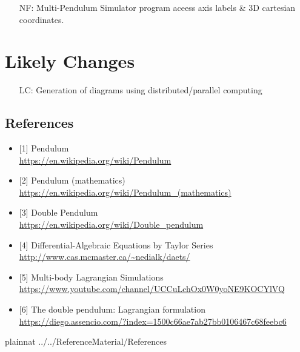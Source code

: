 \documentclass[12pt]{article}
\newcounter{reqnum} %
\newcounter{nfreqnum} %
\newcounter{lcnum} %
\begin{document}
\begin{itemize}
\item[NF\refstepcounter{nfreqnum}\thenfreqnum:] Multi-Pendulum Simulator program aceess axis labels \& 3D cartesian coordinates.
\end{itemize}

\section{Likely Changes}    

\noindent \begin{itemize}

\item[LC\refstepcounter{lcnum}\thelcnum:] Generation of diagrams 
  using distributed/parallel computing

\end{itemize}

\subsection*{References}
\begin{itemize}
\item{[1]} Pendulum \\\url{https://en.wikipedia.org/wiki/Pendulum}
\item{[2]} Pendulum (mathematics) \\\url{https://en.wikipedia.org/wiki/Pendulum_(mathematics)}
\item{[3]} Double Pendulum \\\url{https://en.wikipedia.org/wiki/Double_pendulum}
\item{[4]} Differential-Algebraic Equations by Taylor Series \\\url{http://www.cas.mcmaster.ca/~nedialk/daets/}
\item{[5]} Multi-body Lagrangian Simulations \\\url{https://www.youtube.com/channel/UCCuLchOx0W0yoNE9KOCYlVQ}
\item{[6]} The double pendulum: Lagrangian formulation \\\url{https://diego.assencio.com/?index=1500c66ae7ab27bb0106467c68feebc6}
\end{itemize}

 {plainnat}
 {../../ReferenceMaterial/References}
\end{document}

